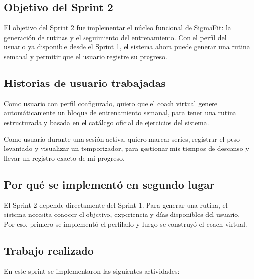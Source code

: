 \documentclass[12pt,a4paper]{article}
\begin{document}
\subsection{Objetivo del Sprint 2}

El objetivo del Sprint 2 fue implementar el núcleo funcional de SigmaFit: la generación de rutinas y el seguimiento del entrenamiento. Con el perfil del usuario ya disponible desde el Sprint 1, el sistema ahora puede generar una rutina semanal y permitir que el usuario registre su progreso.

\subsection{Historias de usuario trabajadas}

\begin{tcolorbox}[title=\textbf{US-02: Motor de generación de rutinas}]
Como usuario con perfil configurado, quiero que el coach virtual genere automáticamente un bloque de entrenamiento semanal, para tener una rutina estructurada y basada en el catálogo oficial de ejercicios del sistema.
\end{tcolorbox}

\begin{tcolorbox}[title=\textbf{US-03: Tracker de entrenamiento en vivo}]
Como usuario durante una sesión activa, quiero marcar series, registrar el peso levantado y visualizar un temporizador, para gestionar mis tiempos de descanso y llevar un registro exacto de mi progreso.
\end{tcolorbox}

\subsection{Por qué se implementó en segundo lugar}

El Sprint 2 depende directamente del Sprint 1. Para generar una rutina, el sistema necesita conocer el objetivo, experiencia y días disponibles del usuario. Por eso, primero se implementó el perfilado y luego se construyó el coach virtual.

\subsection{Trabajo realizado}

En este sprint se implementaron las siguientes actividades:
\end{document}

